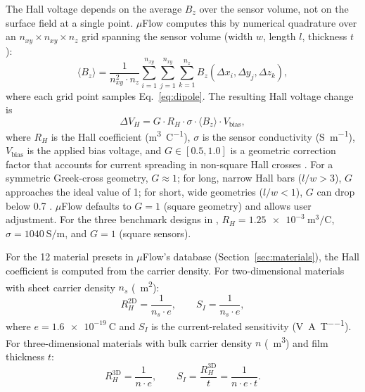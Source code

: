 \documentclass[preprint,review,12pt]{elsarticle}
\begin{document}
The Hall voltage depends on the average $B_z$ over the sensor volume, not on the surface field at a single point. $\mu$Flow computes this by numerical quadrature over an $n_{xy} \times n_{xy} \times n_z$ grid spanning the sensor volume (width $w$, length $l$, thickness $t$):
\begin{equation}
\langle B_z \rangle = \frac{1}{n_{xy}^2 \cdot n_z} \sum_{i=1}^{n_{xy}} \sum_{j=1}^{n_{xy}} \sum_{k=1}^{n_z} B_z(\Delta x_i, \Delta y_j, \Delta z_k),
\label{eq:avgbz}
\end{equation}
where each grid point samples Eq.~\eqref{eq:dipole}. The resulting Hall voltage change is
\begin{equation}
\Delta V_H = G \cdot R_H \cdot \sigma \cdot \langle B_z \rangle \cdot V_{\text{bias}},
\label{eq:vh}
\end{equation}
where $R_H$ is the Hall coefficient (\si{\meter\cubed\per\coulomb}), $\sigma$ is the sensor conductivity (\si{\siemens\per\meter}), $V_{\text{bias}}$ is the applied bias voltage, and $G \in [0.5, 1.0]$ is a geometric correction factor that accounts for current spreading in non-square Hall crosses \cite{popovic2004}. For a symmetric Greek-cross geometry, $G \approx 1$; for long, narrow Hall bars ($l/w > 3$), $G$ approaches the ideal value of 1; for short, wide geometries ($l/w < 1$), $G$ can drop below 0.7 \cite{popovic2004}. $\mu$Flow defaults to $G = 1$ (square geometry) and allows user adjustment. For the three benchmark designs in \cite{govindaraju2025}, $R_H = \SI{1.25e-3}{\meter\cubed\per\coulomb}$, $\sigma = \SI{1040}{\siemens\per\meter}$, and $G = 1$ (square sensors).

For the 12 material presets in $\mu$Flow's database (Section~\ref{sec:materials}), the Hall coefficient is computed from the carrier density. For two-dimensional materials with sheet carrier density $n_s$ (\si{\per\meter\squared}):
\begin{equation}
R_H^{\text{2D}} = \frac{1}{n_s \cdot e}, \qquad S_I = \frac{1}{n_s \cdot e},
\label{eq:rh2d}
\end{equation}
where $e = \SI{1.6e-19}{\coulomb}$ and $S_I$ is the current-related sensitivity (\si{\volt\per\ampere\per\tesla}). For three-dimensional materials with bulk carrier density $n$ (\si{\per\meter\cubed}) and film thickness $t$:
\begin{equation}
R_H^{\text{3D}} = \frac{1}{n \cdot e}, \qquad S_I = \frac{R_H^{\text{3D}}}{t} = \frac{1}{n \cdot e \cdot t}.
\label{eq:rh3d}
\end{equation}
\end{document}

